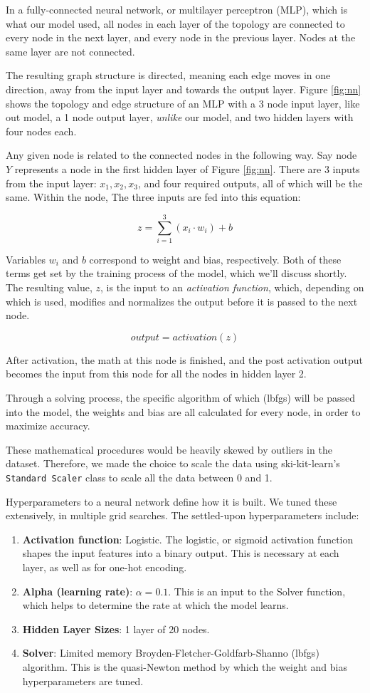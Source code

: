 \documentclass[10pt,sigconf,letterpaper,nonacm]{acmart}
\begin{document}
In a fully-connected neural network, or multilayer perceptron (MLP), which is what our model used, all nodes in each layer of the topology are connected to every node in the next layer, and every node in the previous layer. Nodes at the same layer are not connected.

The resulting graph structure is directed, meaning each edge moves in one direction, away from the input layer and towards the output layer. Figure 
\ref{fig:nn}
shows the topology and edge structure of an MLP with a 3 node input layer, like out model, a 1 node output layer, {\it unlike} our model, and two hidden layers with four nodes each.

Any given node is related to the connected nodes in the following way.
Say node $Y$ represents a node in the first hidden layer of Figure \ref{fig:nn}.
There are 3 inputs from the input layer: $x_1, x_2, x_3$, and four required outputs, all of which will be the same. Within the node, The three inputs are fed into this equation:

$$z = \sum_{i=1}^3(x_i \cdot w_i) + b$$

Variables $w_i$ and $b$ correspond to weight and bias, respectively. Both of these terms get set by the training process of the model, which we'll discuss shortly. 
The resulting value, $z$, is the input to an {\it activation function}, which, depending on which is used, modifies and normalizes the output before it is passed to the next node. 

$$output = activation(z)$$

After activation, the math at this node is finished, and the post activation output becomes the input from this node for all the nodes in hidden layer 2.

Through a solving process, the specific algorithm of which (lbfgs) will be passed into the model, 
the weights and bias are all calculated for every node, in order to maximize accuracy.

These mathematical procedures would be heavily skewed by outliers in the dataset. Therefore, we made the choice to scale the data using ski-kit-learn's \texttt{Standard Scaler} class to scale all the data between 0 and 1.

Hyperparameters to a neural network define how it is built. We tuned these extensively, in multiple grid searches. The settled-upon hyperparameters include:

\begin{enumerate}
    \item {\bf Activation function}: Logistic. The logistic, or sigmoid activation function shapes the input features into a binary output. This is necessary at each layer, as well as for one-hot encoding.
    \item {\bf Alpha (learning rate)}: $\alpha = 0.1$. This is an input to the Solver function, which helps to determine the rate at which the model learns.
    \item {\bf Hidden Layer Sizes}: 1 layer of 20 nodes. 
    \item {\bf Solver}: Limited memory Broyden-Fletcher-Goldfarb-Shanno (lbfgs) algorithm. This is the quasi-Newton method by which the weight and bias hyperparameters are tuned. 
\end{enumerate}
\end{document}
